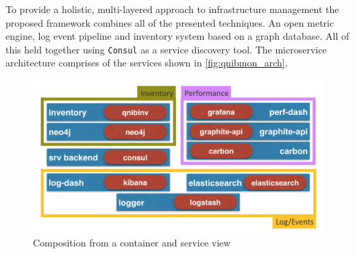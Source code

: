To provide a holistic, multi-layered approach to infrastructure management the proposed framework combines
all of the presented techniques.
An open metric engine, log event pipeline and inventory system based on a graph database.
All of this held together using \texttt{Consul} as a service discovery
tool.
The microservice architecture comprises of the services shown in \autoref{fig:qnibmon_arch}.
\begin{figure}[!ht]
    \includegraphics[width=.4\textwidth]{images/png/qnibmon_arch.png}
    \caption{\label{fig:qnibmon_arch}Composition from a container and service view}
\end{figure}
